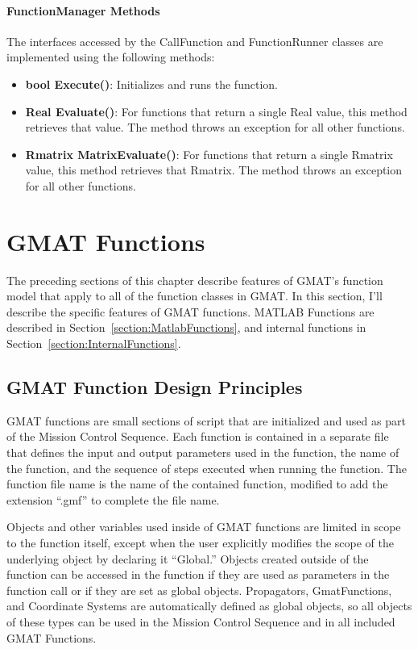 \paragraph{FunctionManager Methods}

The interfaces accessed by the CallFunction and FunctionRunner classes are implemented using the
following methods:

\begin{itemize}
\item \textbf{bool Execute()}: Initializes and runs the function.
\item \textbf{Real Evaluate()}: For functions that return a single Real value, this method
retrieves that value.  The method throws an exception for all other functions.
\item \textbf{Rmatrix MatrixEvaluate()}: For functions that return a single Rmatrix value, this
method retrieves that Rmatrix.  The method throws an exception for all other functions.
\end{itemize}

\section{\label{section:GmatFunctions}GMAT Functions}

The preceding sections of this chapter describe features of GMAT's function model that apply to
all of the function classes in GMAT.  In this section, I'll describe the specific features of
GMAT functions.  MATLAB Functions are described in Section~\ref{section:MatlabFunctions}, and
internal functions in Section~\ref{section:InternalFunctions}.

\subsection{GMAT Function Design Principles}

GMAT functions are small sections of script that are initialized and used as part of the Mission
Control Sequence.  Each function is contained in a separate file that defines the input and output
parameters used in the function, the name of the function, and the sequence of steps executed when
running the function.  The function file name is the name of the contained function, modified to add
the extension ``.gmf'' to complete the file name.

Objects and other variables used inside of GMAT functions are limited in scope to the function
itself, except when the user explicitly modifies the scope of the underlying object by declaring it
``Global.''  Objects created outside of the function can be accessed in the function if they are
used as parameters in the function call or if they are set as global objects.  Propagators,
GmatFunctions, and Coordinate Systems are automatically defined as global objects, so all objects of
these types can be used in the Mission Control Sequence and in all included GMAT Functions.

